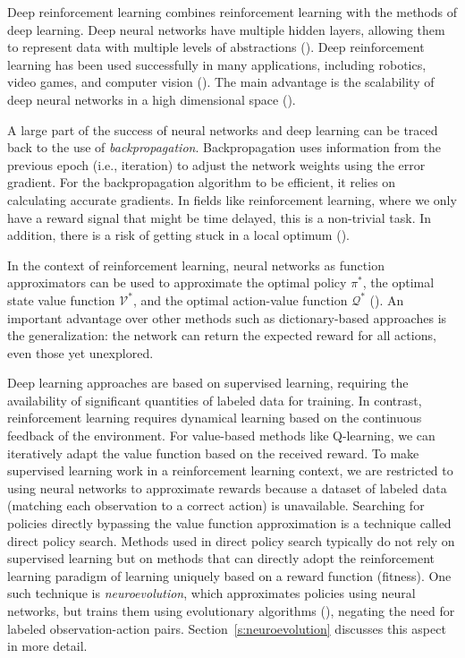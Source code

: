 Deep reinforcement learning combines reinforcement learning with the methods of deep learning. Deep neural networks have multiple hidden layers, allowing them to represent data with multiple levels of abstractions (\cite{lecun2015deep}). Deep reinforcement learning has been used successfully in many applications, including robotics, video games, and computer vision (\cite{franccois2018introduction}). The main advantage is the scalability of deep neural networks in a high dimensional space (\cite{dong2020deep}).

A large part of the success of neural networks and deep learning can be traced back to the use of \textit{backpropagation}. Backpropagation uses information from the previous epoch (i.e., iteration) to adjust the network weights using the error gradient. For the backpropagation algorithm to be efficient, it relies on calculating accurate gradients. In fields like reinforcement learning, where we only have a reward signal that might be time delayed, this is a non-trivial task. In addition, there is a risk of getting stuck in a local optimum (\cite{ha2017visual}).

In the context of reinforcement learning, neural networks as function approximators can be used to approximate the optimal policy $\pi^*$, the optimal state value function $\mathcal{V}^*$, and the optimal action-value function $\mathcal{Q}^*$ (\cite{golovin2017google}). An important advantage over other methods such as dictionary-based approaches is the generalization: the network can return the expected reward for all actions, even those yet unexplored.

Deep learning approaches are based on supervised learning, requiring the availability of significant quantities of labeled data for training. In contrast, reinforcement learning requires dynamical learning based on the continuous feedback of the environment. For value-based methods like Q-learning, we can iteratively adapt the value function based on the received reward. To make supervised learning work in a reinforcement learning context, we are restricted to using neural networks to approximate rewards because a dataset of labeled data (matching each observation to a correct action) is unavailable. Searching for policies directly bypassing the value function approximation is a technique called direct policy search. Methods used in direct policy search typically do not rely on supervised learning but on methods that can directly adopt the reinforcement learning paradigm of learning uniquely based on a reward function (fitness). One such technique is \textit{neuroevolution}, which approximates policies using neural networks, but trains them using evolutionary algorithms (\cite{stanley2019designing}), negating the need for labeled observation-action pairs. Section~\ref{s:neuroevolution} discusses this aspect in more detail.


